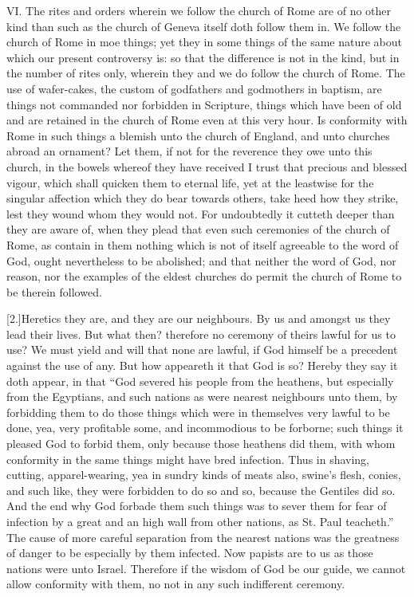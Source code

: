 VI. The rites and orders wherein we follow the church of Rome are of no other kind than such as the church of Geneva itself doth follow them in. We follow the church of Rome in moe things; yet they in some things of the same nature about which our present controversy is: so that the difference is not in the kind, but in the number of rites only, wherein they and we do follow the church of Rome. The use of wafer-cakes, the custom of godfathers and godmothers in baptism, are things not commanded nor forbidden in Scripture, things which have been of old and are retained in the church of Rome even at this very hour. Is conformity with Rome in such things a blemish unto the church of England, and unto churches abroad an ornament? Let them, if not for the reverence they owe unto this church, in the bowels whereof they have received I trust that precious and blessed vigour, which shall quicken them to eternal life, yet at the  leastwise for the singular affection which they do bear towards others, take heed how they strike, lest they wound whom they would not. For undoubtedly it cutteth deeper than they are aware of, when they plead that even such ceremonies of the church of Rome, as contain in them nothing which is not of itself agreeable to the word of God, ought nevertheless to be abolished; and that neither the word of God, nor reason, nor the examples of the eldest churches do permit the church of Rome to be therein followed.

[2.]Heretics they are, and they are our neighbours. By us and amongst us they lead their lives. But what then? therefore no ceremony of theirs lawful for us to use? We must yield and will that none are lawful, if God himself be a precedent against the use of any. But how appeareth it that God is so? Hereby they say it doth appear, in that “God severed his people from the heathens, but especially from the Egyptians, and such nations as were nearest neighbours unto them, by forbidding them to do those things which were in themselves very lawful to be done, yea, very profitable some, and incommodious to be forborne; such things it pleased God to forbid them, only because those heathens did them, with whom conformity in the same things might have bred infection. Thus in shaving, cutting, apparel-wearing, yea in sundry kinds of meats also, swine’s flesh, conies, and such like, they were forbidden to do so and so, because the Gentiles did so. And the end why God forbade them such things was to sever them for fear of infection by a great and an high wall from other nations, as St. Paul teacheth.” The cause of more careful separation from the nearest nations was the greatness of danger to be especially by them infected. Now papists are to us as those nations were unto Israel. Therefore if the wisdom of God be our guide, we cannot allow conformity with them, no not in any such indifferent ceremony.

